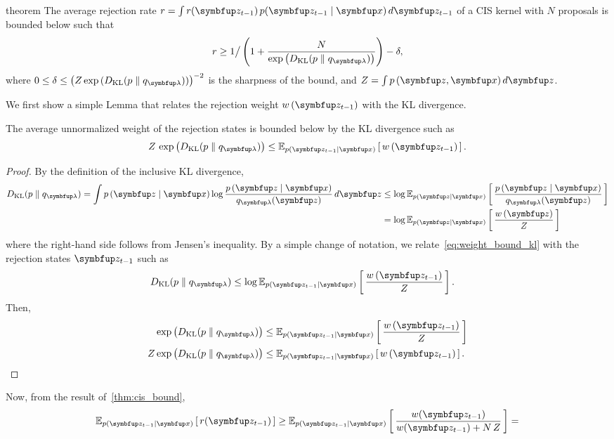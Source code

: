 
\begin{theoremEnd}[]{theorem}\label{thm:cis_bound_kl}
  The average rejection rate \(r = \int r(\vz_{t-1}) \, p(\vz_{t-1}\mid\vx) \, d\vz_{t-1} \) of a CIS kernel with \(N\) proposals is bounded below such that
  \[
  r \geq 1 \big/ 
    \left(1 + \frac{N}{
      \exp\big(\DKL{p}{q_{\vlambda}}\big)
    }
    \right) - \delta,
  \]
  where \(
  0 \leq \delta \leq {\big( Z \exp\,( \DKL{p}{q_{\vlambda}} ) \big)}^{-2} 
  \)
  is the sharpness of the bound, and \(Z = \int p\,(\vz,\vx) \, d\vz\).
\end{theoremEnd}
\begin{proofEnd}
  We first show a simple Lemma that relates the rejection weight \(w\,(\vz_{t-1})\) with the KL divergence.
  \begin{framedlemma}\label{thm:rej_kl_bound}
    The average unnormalized weight of the rejection states is bounded below by the KL divergence such as
    \[
    Z\,\exp\big(\DKL{p}{q_{\vlambda}}\big) \leq \Esub{p(\vz_{t-1}\mid\vx)}{w\,(\vz_{t-1})}.
    \]
  \begin{proof}
    By the definition of the inclusive KL divergence,
    \begin{align}
      \DKL{p}{q_{\vlambda}} = \int p\,(\vz\mid\vx) \log \frac{p\,(\vz\mid\vx)}{q_{\vlambda}(\vz)} \, d\vz
      &\leq \log \Esub{p(\vz\mid\vx)}{\frac{p\,(\vz\mid\vx)}{q_{\vlambda}(\vz)}} \\
      &= \log \Esub{p(\vz\mid\vx)}{ \frac{w\,(\vz)}{Z} } \label{eq:weight_bound_kl}
    \end{align}
    where the right-hand side follows from Jensen's inequality.
    By a simple change of notation, we relate~\eqref{eq:weight_bound_kl} with the rejection states \(\vz_{t-1}\) such as
    \begin{align}
      \DKL{p}{q_{\vlambda}} &\leq \log \Esub{p(\vz_{t-1}\mid\vx)}{\frac{w\,(\vz_{t-1})}{Z}}.
    \end{align}
    Then,
    \begin{align}
      \exp\big(\DKL{p}{q_{\vlambda}}\big) &\leq \Esub{p(\vz_{t-1}\mid\vx)}{
        \frac{w\,(\vz_{t-1})}{Z}} \\
      Z \exp\big(\DKL{p}{q_{\vlambda}}\big) &\leq \Esub{p(\vz_{t-1}\mid\vx)}{w\,(\vz_{t-1})}.
    \end{align}
  \end{proof}
  \end{framedlemma}
  Now, from the result of~\cref{thm:cis_bound},
  \begin{equation}
    \Esub{p(\vz_{t-1}\mid\vx)}{ r(\vz_{t-1}) } \geq \Esub{p(\vz_{t-1}\mid\vx)}{ \frac{w(\vz_{t-1})}{w(\vz_{t-1}) + N\,Z}} =

\end{equation}
\end{proofEnd}
